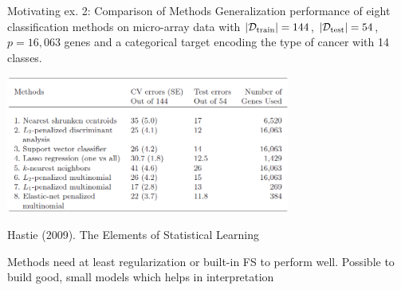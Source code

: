 \documentclass[11pt,compress,t,notes=noshow, xcolor=table]{beamer}
\begin{document}
  \begin{vbframe}{Motivating ex. 2: Comparison of Methods}
  Generalization performance of eight classification methods on micro-array data with $| \mathcal{D}_{\text{train}} | = 144$, $| \mathcal{D}_{\text{test}} | = 54$, $p=16, 063$ genes and a categorical target encoding the type of cancer with 14 classes.
\vspace{0.25cm}
  \begin{center}
  \includegraphics[width=0.7\textwidth]{figure_man/tibshirani_tab_18_1.png}

  \footnotesize{Hastie (2009). The Elements of Statistical Learning}
  \end{center}
  Methods need at least regularization or built-in FS to perform well. Possible to build good, small models which helps in interpretation 
  \end{vbframe}
\end{document}

